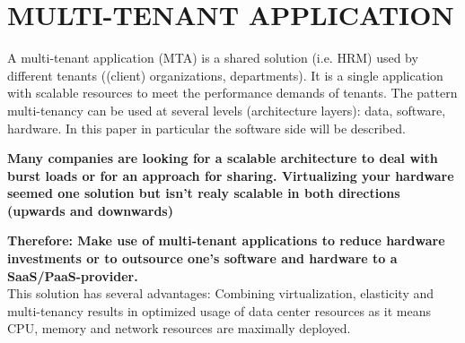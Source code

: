 \newpage
\section*{MULTI-TENANT APPLICATION}


A multi-tenant application (MTA) is a shared solution (i.e. HRM) used by different tenants ((client) organizations, departments). It is a single application with scalable resources to meet the performance demands of tenants. 
The pattern multi-tenancy can be used at several levels (architecture layers): data, software, hardware. In this paper in particular the software side will be described.

\begin{center}
  
\end{center}

\textbf{Many companies are looking for a scalable architecture to deal with burst loads or for an approach for sharing. Virtualizing your hardware seemed one solution but isn't realy scalable in both directions (upwards and downwards)}\\


\begin{center}
   
\end{center}

\textbf{Therefore: Make use of multi-tenant applications to reduce hardware investments or to outsource one's software and hardware to a SaaS/PaaS-provider.}\\

This solution has several advantages: Combining virtualization, elasticity and multi-tenancy results in optimized usage of data center
resources as it means CPU, memory and network resources are maximally deployed.


